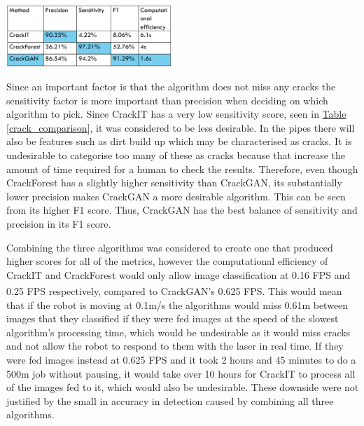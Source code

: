 \documentclass[11pt]{article}		%
\newcommand{\supercite}[1]{\textsuperscript{\cite{#1}}}		%
\newcommand{\tableref}[1]{\hyperref[#1]{Table \ref*{#1}}}     %
\begin{document}
       \begin{floatingfigure}[r]{0.5\textwidth}
			\centering
			\includegraphics[width=0.47\textwidth]{CrackGAN_comparisonv1}
			\label{crack_comparison}
		\end{floatingfigure}
        \hspace*{2ex}Since an important factor is that the algorithm does not miss any cracks the sensitivity factor is more important than precision when deciding on which algorithm to pick. Since CrackIT has a very low sensitivity score, seen in \tableref{crack_comparison}, it was considered to be less desirable. In the pipes there will also be features such as dirt build up which may be characterised as cracks. It is undesirable to categorise too many of these as cracks because that increase the amount of time required for a human to check the results. Therefore, even though CrackForest has a slightly higher sensitivity than CrackGAN, its substantially lower precision makes CrackGAN a more desirable algorithm. This can be seen from its higher F1 score. Thus, CrackGAN has the best balance of sensitivity and precision in its F1 score. 
        \begin{floatingfigure}[r]{0pt} \end{floatingfigure}
        \hspace*{2ex}Combining the three algorithms was considered to create one that produced higher scores for all of the metrics, however the computational efficiency of CrackIT and CrackForest would only allow image classification at 0.16 FPS and 0.25 FPS respectively, compared to CrackGAN’s 0.625 FPS\supercite{CrackGAN1}. This would mean that if the robot is moving at 0.1m/s the algorithms would miss 0.61m between images that they classified if they were fed images at the speed of the slowest algorithm’s processing time, which would be undesirable as it would miss cracks and not allow the robot to respond to them with the laser in real time. If they were fed images instead at 0.625 FPS and it took 2 hours and 45 minutes to do a 500m job without pausing, it would take over 10 hours for CrackIT to process all of the images fed to it, which would also be undesirable. These downside were not justified by the small in accuracy in detection caused by combining all three algorithms. %
\end{document}
